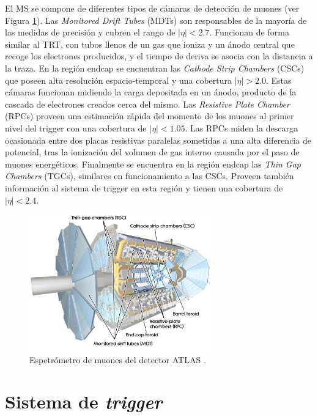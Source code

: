 El MS se compone de diferentes tipos de cámaras de detección de muones (ver Figura \ref{fig:muon_1}). Las \textit{Monitored Drift Tubes} (MDTs) son responsables de la mayoría de las medidas de precisión y cubren el rango de $|\eta|<2.7$. Funcionan de forma similar al TRT, con tubos llenos de un gas que ioniza y un ánodo central que recoge los electrones producidos, y el tiempo de deriva se asocia con la distancia a la traza. En la región endcap se encuentran las \textit{Cathode Strip Chambers} (CSCs) que poseen alta resolución espacio-temporal y una cobertura $|\eta|>2.0$. Estas cámaras funcionan midiendo la carga depositada en un ánodo, producto de la cascada de electrones creados cerca del mismo. Las \textit{Resistive Plate Chamber} (RPCs) proveen una estimación rápida del momento de los muones al primer nivel del trigger con una cobertura de $|\eta|<1.05$. Las RPCs miden la descarga ocasionada entre dos placas resistivas paralelas sometidas a una alta diferencia de potencial, tras la ionización del volumen de gas interno causada por el paso de muones energéticos. Finalmente se encuentra en la región endcap las \textit{Thin Gap Chambers} (TGCs), similares en funcionamiento a las CSCs. Proveen también información al sistema de trigger en esta región y tienen una cobertura de $|\eta|<2.4$.

\begin{figure}
  \centering
  \includegraphics[width=0.7\textwidth]{images/lhc/muon_1.jpg}
  \caption{Espetrómetro de muones del detector ATLAS \cite{Pequenao:1095929}.}
  \label{fig:muon_1}
\end{figure}

\section{Sistema de \textit{trigger}}
\label{trigger}

